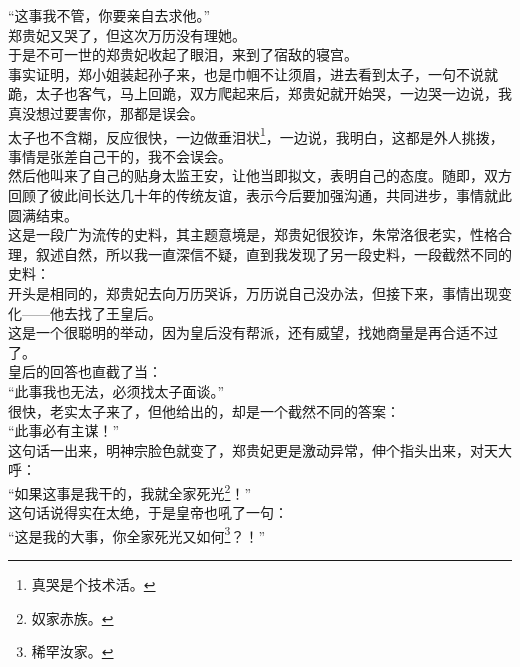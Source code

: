 \begin{multicols}{\theparacolNo}
“这事我不管，你要亲自去求他。”\\

郑贵妃又哭了，但这次万历没有理她。\\

于是不可一世的郑贵妃收起了眼泪，来到了宿敌的寝宫。\\

事实证明，郑小姐装起孙子来，也是巾帼不让须眉，进去看到太子，一句不说就跪，太子也客气，马上回跪，双方爬起来后，郑贵妃就开始哭，一边哭一边说，我真没想过要害你，那都是误会。\\

太子也不含糊，反应很快，一边做垂泪状\footnote{真哭是个技术活。}，一边说，我明白，这都是外人挑拨，事情是张差自己干的，我不会误会。\\

然后他叫来了自己的贴身太监王安，让他当即拟文，表明自己的态度。随即，双方回顾了彼此间长达几十年的传统友谊，表示今后要加强沟通，共同进步，事情就此圆满结束。\\

这是一段广为流传的史料，其主题意境是，郑贵妃很狡诈，朱常洛很老实，性格合理，叙述自然，所以我一直深信不疑，直到我发现了另一段史料，一段截然不同的史料：\\

开头是相同的，郑贵妃去向万历哭诉，万历说自己没办法，但接下来，事情出现变化——他去找了王皇后。\\

这是一个很聪明的举动，因为皇后没有帮派，还有威望，找她商量是再合适不过了。\\

皇后的回答也直截了当：\\

“此事我也无法，必须找太子面谈。”\\

很快，老实太子来了，但他给出的，却是一个截然不同的答案：\\

“此事必有主谋！”\\

这句话一出来，明神宗脸色就变了，郑贵妃更是激动异常，伸个指头出来，对天大呼：\\

“如果这事是我干的，我就全家死光\footnote{奴家赤族。}！”\\

这句话说得实在太绝，于是皇帝也吼了一句：\\

“这是我的大事，你全家死光又如何\footnote{稀罕汝家。}？！”\\


\end{multicols}
